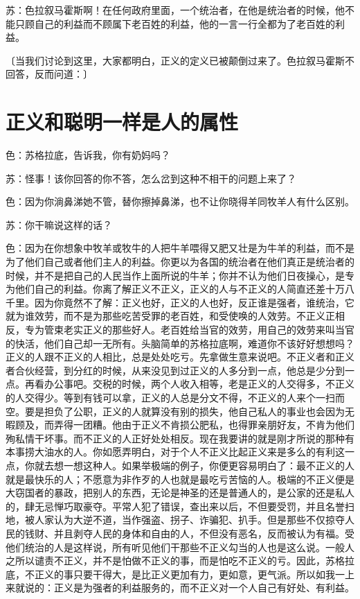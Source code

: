 \documentclass[11pt,oneside]{book}
\begin{document}
\begin{common-format}
苏：色拉叙马霍斯啊！在任何政府里面，一个统治者，在他是统治者的时候，他不能只顾自己的利益而不顾属下老百姓的利益，他的一言一行全都为了老百姓的利益。

〔当我们讨论到这里，大家都明白，正义的定义已被颠倒过来了。色拉叙马霍斯不回答，反而问道：〕


\section{正义和聪明一样是人的属性}
色：苏格拉底，告诉我，你有奶妈吗？

苏：怪事！该你回答的你不答，怎么岔到这种不相干的问题上来了？

色：因为你淌鼻涕她不管，替你擦掉鼻涕，也不让你晓得羊同牧羊人有什么区别。

苏：你干嘛说这样的话？

色：因为在你想象中牧羊或牧牛的人把牛羊喂得又肥又壮是为牛羊的利益，而不是为了他们自己或者他们主人的利益。你更以为各国的统治者在他们真正是统治者的时候，并不是把自己的人民当作上面所说的牛羊；你并不认为他们日夜操心，是专为他们自己的利益。你离了解正义不正义，正义的人与不正义的人简直还差十万八千里。因为你竟然不了解：正义也好，正义的人也好，反正谁是强者，谁统治，它就为谁效劳，而不是为那些吃苦受罪的老百姓，和受使唤的人效劳。不正义正相反，专为管束老实正义的那些好人。老百姓给当官的效劳，用自己的效劳来叫当官的快活，他们自己却一无所有。头脑简单的苏格拉底啊，难道你不该好好想想吗？正义的人跟不正义的人相比，总是处处吃亏。先拿做生意来说吧。不正义者和正义者合伙经营，到分红的时候，从来没见到过正义的人多分到一点，他总是少分到一点。再看办公事吧。交税的时候，两个人收入相等，老是正义的人交得多，不正义的人交得少。等到有钱可以拿，正义的人总是分文不得，不正义的人来个一扫而空。要是担负了公职，正义的人就算没有别的损失，他自己私人的事业也会因为无暇顾及，而弄得一团糟。他由于正义不肯损公肥私，也得罪亲朋好友，不肯为他们殉私情干坏事。而不正义的人正好处处相反。现在我要讲的就是刚才所说的那种有本事捞大油水的人。你如愿弄明白，对于个人不正义比起正义来是多么的有利这一点，你就去想一想这种人。如果举极端的例子，你便更容易明白了：最不正义的人就是最快乐的人；不愿意为非作歹的人也就是最吃亏苦恼的人。极端的不正义便是大窃国者的暴政，把别人的东西，无论是神圣的还是普通人的，是公家的还是私人的，肆无忌惮巧取豪夺。平常人犯了错误，查出来以后，不但要受罚，并且名誉扫地，被人家认为大逆不道，当作强盗、拐子、诈骗犯、扒手。但是那些不仅掠夺人民的钱财、并且剥夺人民的身体和自由的人，不但没有恶名，反而被认为有福。受他们统治的人是这样说，所有听见他们干那些不正义勾当的人也是这么说。一般人之所以谴责不正义，并不是怕做不正义的事，而是怕吃不正义的亏。因此，苏格拉底，不正义的事只要干得大，是比正义更加有力，更如意，更气派。所以如我一上来就说的：正义是为强者的利益服务的，而不正义对一个人自己有好处、有利益。


\end{common-format}
\end{document}
